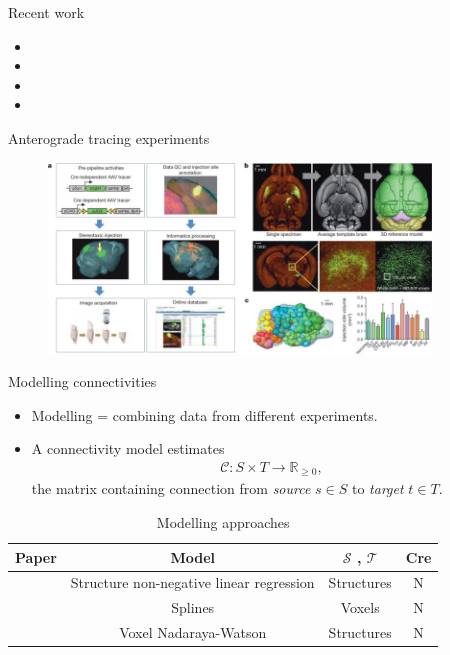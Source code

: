\documentclass{beamer}
\begin{document}
\begin{frame}{Recent work}
\begin{itemize}
    \item {}
    \item {}
    \item {}
    \item {}
\end{itemize}
\end{frame}

\begin{frame}{Anterograde tracing experiments}
\begin{figure}
    \centering
    \includegraphics[width = 4in]{figs/figsforpres/oh2014figure1.jpg}
    \caption{\citeauthor{Oh2014-kh}}
    \label{fig:my_label}
\end{figure}
\end{frame}

\begin{frame}{Modelling connectivities}
\begin{itemize}
    \item Modelling = combining data from different experiments.
\item A connectivity model estimates 
\begin{eqnarray*}
\mathcal C: S \times T \to \mathbb R_{\geq 0},
\end{eqnarray*}
the matrix containing connection from \textit{source} $s \in S$ to \textit{target} $t \in T$.  
\end{itemize}

\begin{table}
    \centering
    \begin{adjustbox}{width=.8\columnwidth,center}
    \begin{tabular}{c|c|c|c}
        Paper & Model & $\mathcal S$ , $\mathcal T $ & Cre \\
         \hline
        \citet{Oh2014-kh} & Structure non-negative linear regression & Structures & N \\
        \citet{Harris2016-fn}  & Splines & Voxels & N   \\
        \citet{Knox2019-ot} & Voxel Nadaraya-Watson &   Structures  &   N
        \end{tabular}
    \end{adjustbox}
    \caption{Modelling approaches}
    \label{tab:my_label}
\end{table}
\end{frame}
\end{document}
